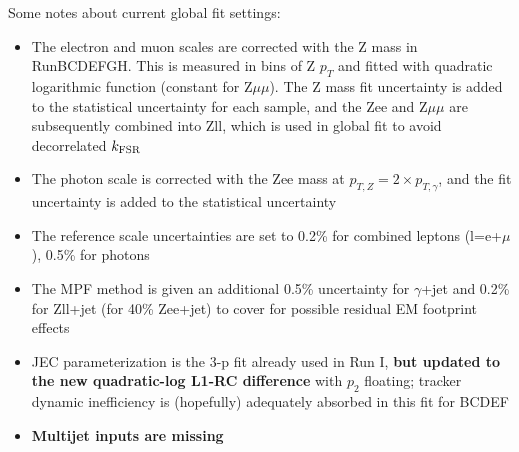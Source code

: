 \documentclass[landscape,10pt]{beamer} %
\begin{document}
\newpage

Some notes about current global fit settings:
\begin{itemize}
\item The electron and muon scales are corrected with the Z mass in RunBCDEFGH. This is measured in bins of Z $p_T$ and fitted with quadratic logarithmic function (constant for Z$\mu\mu$). The Z mass fit uncertainty is added to the statistical uncertainty for each sample, and the Zee and Z$\mu\mu$ are subsequently combined into Zll, which is used in global fit to avoid decorrelated $k_{\rm FSR}$
\item The photon scale is corrected with the Zee mass at $p_{T,Z}=2\times p_{T,\gamma}$, and the fit uncertainty is added to the statistical uncertainty
\item The reference scale uncertainties are set to 0.2\% for combined leptons (l=e+$\mu$), 0.5\% for photons
\item The MPF method is given an additional 0.5\% uncertainty for $\gamma$+jet and 0.2\% for Zll+jet (for 40\% Zee+jet) to cover for possible residual EM footprint effects
\item JEC parameterization is the 3-p fit already used in Run I, {\bf but updated to the new quadratic-log L1-RC difference} with $p_2$ floating; tracker dynamic inefficiency is (hopefully) adequately absorbed in this fit for BCDEF
\item {\bf Multijet inputs are missing}
\end{itemize}

\newpage
\end{document}
